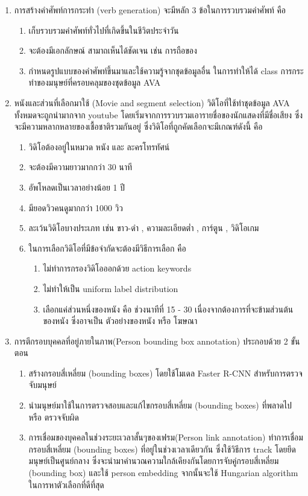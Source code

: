 \begin{enumerate}
	\item การสร้างคำศัพท์การกระทำ (verb generation) จะมีหลัก 3 ข้อในการรวบรวมคำศัพท์ คือ
	\begin{enumerate}
		\item เก็บรวบรวมคำศัพท์ทั่วไปที่เกิดขึ้นในชีวิตประจำวัน
		\item จะต้องมีเอกลักษณ์ สามาถเห็นได้ชัดเจน เช่น การถือของ
		\item กำหนดรูปแบบของคำศัพท์ขึ้นมาและใช้ความรู้จากชุดข้อมูลอื่น ในการทำให้ได้ class การกระทำของมนุษย์ที่ครอบคลุมของชุดข้อมูล AVA
	\end{enumerate}
	\setlength\itemsep{-0.25em}
	\item  หนังและส่วนที่เลือกมาใช้ (Movie and segment selection)
วิดิโอที่ใช้ทำชุดข้อมูล AVA ทั้งหมดจะถูกนำมากจาก youtube โดยเริ่มจากการรวบรวมเอารายชื่อของนักแสดงที่มีชื่อเสียง ซึ่งจะมีความหลากหลายของเชื้อชาติรวมกันอยู่ ซึ่งวิดิโอที่ถูกคัดเลือกจะมีเกณฑ์ดังนี้ คือ
	\begin{enumerate}
		\item วิดิโอต้องอยู่ในหมวด หนัง และ ละครโทรทัศน์
		\item จะต้องมีความยาวมากกว่า 30 นาที
		\item อัพโหลดเป็นเวลาอย่างน้อย 1 ปี
		\item มียอดวิวคนดูมากกว่า 1000 วิว
		\item ละเว้นวิดิโอบางประเภท เช่น ขาว-ดำ , ความละเอียดต่ำ , การ์ตูน , วิดิโอเกม
		\item ในการเลือกวิดิโอที่มีข้อจำกัดจะต้องมีวิธีการเลือก คือ 
		\begin{enumerate}
			\item ไม่ทำการกรองวิดิโอออกด้วย action keywords 
			\item ไม่ทำให้เป็น uniform label distribution 
			\item เลือกแค่ส่วนหนึ่งของหนัง คือ ช่วงนาทีที่ 15 - 30 เนื่องจากต้องการที่จะข้ามส่วนต้นของหนัง ซึ่งอาจเป็น ตัวอย่างของหนัง หรือ โฆษณา
		\end{enumerate}	
	\end{enumerate}
	\setlength\itemsep{-0.25em}
	\item  การตีกรอบบุคคลที่อยู่ภายในภาพ(Person bounding box annotation) ประกอบด้วย 2 ขั้นตอน
	\begin{enumerate}
		\item สร้างกรอบสี่เหลี่ยม (bounding boxes) โดยใช้โมเดล Faster R-CNN สำหรับการตรวจจับมนุษย์
		\item นำมนุษย์มาใช้ในการตรวจสอบและแก้ไขกรอบสี่เหลี่ยม (bounding boxes) ที่พลาดไป หรือ ตรวจจับผิด
	\item  การเชื่อมของบุคคลในช่วงระยะเวลาสั้นๆของเฟรม(Person link annotation) ทำการเชื่อมกรอบสี่เหลี่ยม (bounding boxes) ที่อยู่ในช่วงเวลาเดียวกัน ซึ่งใช้วิธีการ track โดยยึดมนุษย์เป็นศูนย์กลาง ซึ่งจะนำมาคำนวณความใกล้เคียงกันโดยการจับคู่กรอบสี่เหลี่ยม (bounding box) และใช้ person embedding จากนั้นจะใช้ Hungarian algorithm ในการหาตัวเลือกที่ดีที่สุด
	\end{enumerate}	
\end{enumerate}
\clearpage
